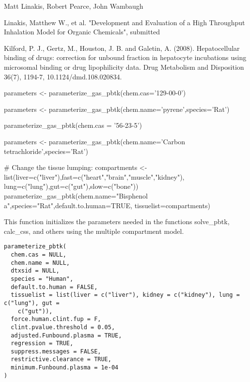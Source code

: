 \documentclass[a4paper]{book}
\begin{document}
%
\begin{Author}\relax
Matt Linakis, Robert Pearce, John Wambaugh
\end{Author}
%
\begin{References}\relax
Linakis, Matthew W., et al. "Development and Evaluation of a High Throughput 
Inhalation Model for Organic Chemicals", submitted

Kilford, P. J., Gertz, M., Houston, J. B. and Galetin, A.
(2008). Hepatocellular binding of drugs: correction for unbound fraction in
hepatocyte incubations using microsomal binding or drug lipophilicity data.
Drug Metabolism and Disposition 36(7), 1194-7, 10.1124/dmd.108.020834.
\end{References}
%
\begin{Examples}
\begin{ExampleCode}
parameters <- parameterize_gas_pbtk(chem.cas='129-00-0')

parameters <- parameterize_gas_pbtk(chem.name='pyrene',species='Rat')

parameterize_gas_pbtk(chem.cas = '56-23-5')

parameters <- parameterize_gas_pbtk(chem.name='Carbon tetrachloride',species='Rat')

# Change the tissue lumping:
compartments <- list(liver=c("liver"),fast=c("heart","brain","muscle","kidney"),
                      lung=c("lung"),gut=c("gut"),slow=c("bone"))
parameterize_gas_pbtk(chem.name="Bisphenol a",species="Rat",default.to.human=TRUE,
                   tissuelist=compartments) 

\end{ExampleCode}
\end{Examples}
%
\begin{Description}\relax
This function initializes the parameters needed in the functions solve\_pbtk,
calc\_css, and others using the multiple compartment model.
\end{Description}
%
\begin{Usage}
\begin{verbatim}
parameterize_pbtk(
  chem.cas = NULL,
  chem.name = NULL,
  dtxsid = NULL,
  species = "Human",
  default.to.human = FALSE,
  tissuelist = list(liver = c("liver"), kidney = c("kidney"), lung = c("lung"), gut =
    c("gut")),
  force.human.clint.fup = F,
  clint.pvalue.threshold = 0.05,
  adjusted.Funbound.plasma = TRUE,
  regression = TRUE,
  suppress.messages = FALSE,
  restrictive.clearance = TRUE,
  minimum.Funbound.plasma = 1e-04
)
\end{verbatim}
\end{Usage}
\end{document}
